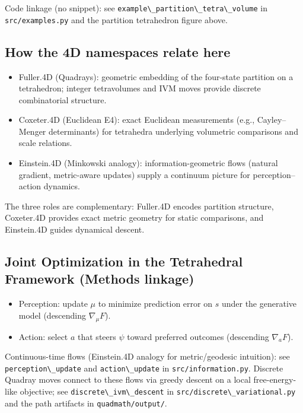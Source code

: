 \documentclass[
  10pt,
]{article}
\newcommand{\passthrough}[1]{#1}
\providecommand{\tightlist}{%
  \setlength{\itemsep}{0pt}\setlength{\parskip}{0pt}}
\begin{document}
Code linkage (no snippet): see
\passthrough{\lstinline!example\_partition\_tetra\_volume!} in
\passthrough{\lstinline!src/examples.py!} and the partition tetrahedron
figure above.

\hypertarget{how-the-4d-namespaces-relate-here}{%
\subsection{How the 4D namespaces relate
here}\label{how-the-4d-namespaces-relate-here}}

\begin{itemize}
\tightlist
\item
  Fuller.4D (Quadrays): geometric embedding of the four-state partition
  on a tetrahedron; integer tetravolumes and IVM moves provide discrete
  combinatorial structure.
\item
  Coxeter.4D (Euclidean E4): exact Euclidean measurements (e.g.,
  Cayley--Menger determinants) for tetrahedra underlying volumetric
  comparisons and scale relations.
\item
  Einstein.4D (Minkowski analogy): information-geometric flows (natural
  gradient, metric-aware updates) supply a continuum picture for
  perception--action dynamics.
\end{itemize}

The three roles are complementary: Fuller.4D encodes partition
structure, Coxeter.4D provides exact metric geometry for static
comparisons, and Einstein.4D guides dynamical descent.

\hypertarget{joint-optimization-in-the-tetrahedral-framework-methods-linkage}{%
\subsection{Joint Optimization in the Tetrahedral Framework (Methods
linkage)}\label{joint-optimization-in-the-tetrahedral-framework-methods-linkage}}

\begin{itemize}
\tightlist
\item
  Perception: update \(\mu\) to minimize prediction error on \(s\) under
  the generative model (descending \(\nabla_{\mu} F\)).
\item
  Action: select \(a\) that steers \(\psi\) toward preferred outcomes
  (descending \(\nabla_{a} F\)).
\end{itemize}

Continuous-time flows (Einstein.4D analogy for metric/geodesic
intuition): see \passthrough{\lstinline!perception\_update!} and
\passthrough{\lstinline!action\_update!} in
\passthrough{\lstinline!src/information.py!}. Discrete Quadray moves
connect to these flows via greedy descent on a local free-energy-like
objective; see \passthrough{\lstinline!discrete\_ivm\_descent!} in
\passthrough{\lstinline!src/discrete\_variational.py!} and the path
artifacts in \passthrough{\lstinline!quadmath/output/!}.
\end{document}
